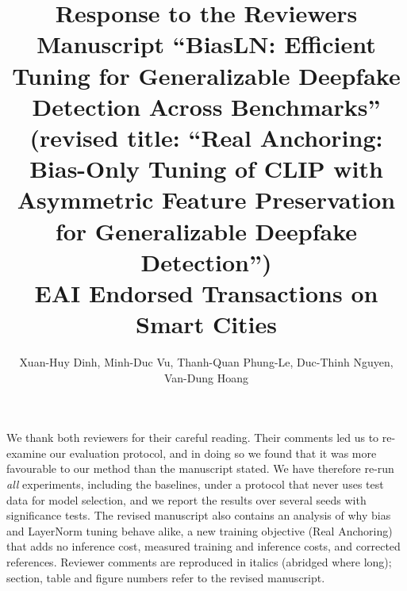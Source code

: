 \documentclass[11pt]{article}
\title{Response to the Reviewers\\[2pt]\normalsize Manuscript ``BiasLN: Efficient Tuning for Generalizable Deepfake Detection Across Benchmarks''\\(revised title: ``Real Anchoring: Bias-Only Tuning of CLIP with Asymmetric Feature Preservation for Generalizable Deepfake Detection'')\\EAI Endorsed Transactions on Smart Cities}
\author{Xuan-Huy Dinh, Minh-Duc Vu, Thanh-Quan Phung-Le, Duc-Thinh Nguyen, Van-Dung Hoang}
\date{}
\begin{document}
\maketitle

We thank both reviewers for their careful reading. Their comments led us to re-examine our evaluation protocol, and in doing so we found that it was more favourable to our method than the manuscript stated. We have therefore re-run \emph{all} experiments, including the baselines, under a protocol that never uses test data for model selection, and we report the results over several seeds with significance tests. The revised manuscript also contains an analysis of why bias and LayerNorm tuning behave alike, a new training objective (Real Anchoring) that adds no inference cost, measured training and inference costs, and corrected references. Reviewer comments are reproduced in italics (abridged where long); section, table and figure numbers refer to the revised manuscript.
\end{document}
